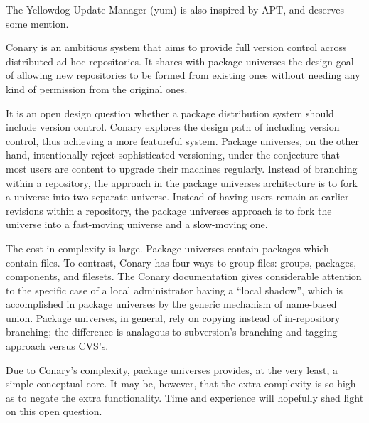 \documentclass{article}
\begin{document}
The Yellowdog Update Manager (yum) is also inspired by APT, and deserves
some mention.


Conary is an ambitious system that aims to provide full version
control across distributed ad-hoc repositories.  
It shares with
package universes the design goal of allowing new repositories to be
formed from existing ones without needing any kind of permission from
the original ones.

It is an open design question whether a package distribution system
should include version control.  Conary explores the design path of
including version control, thus achieving a more featureful system.
Package universes, on the other hand, intentionally reject
sophisticated versioning, under the conjecture that most users are
content to upgrade their machines regularly.  Instead of branching
within a repository, the approach in the package universes
architecture is to fork a universe into two separate universe.
Instead of having users remain at earlier revisions within a
repository, the package universes approach is to fork the universe
into a fast-moving universe and a slow-moving one.

The cost in complexity is large.  Package universes contain packages
which contain files.  To contrast, Conary has four ways to group
files: groups, packages, components, and filesets.  The Conary
documentation gives considerable attention to the specific case of a
local administrator having a ``local shadow'', which is accomplished
in package universes by the generic mechanism of name-based union.
Package universes, in general, rely on copying instead of
in-repository branching; the difference is analagous to subversion's
branching and tagging approach
versus CVS's.


Due to Conary's complexity, package universes provides, at the very
least, a simple conceptual core.  It may be, however, that the extra
complexity is so high as to negate the extra functionality.  Time and
experience will hopefully shed light on this open question.




\end{document}
